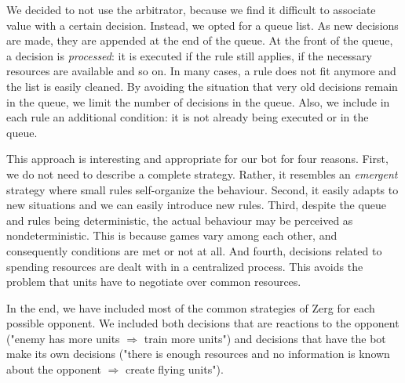We decided to not use the arbitrator, because we find it difficult to associate value with a certain decision. Instead, we opted for a queue list. As new decisions are made, they are appended at the end of the queue. At the front of the queue, a decision is \emph{processed}: it is executed if the rule still applies, if the necessary resources are available and so on. In many cases, a rule does not fit anymore and the list is easily cleaned. By avoiding the situation that very old decisions remain in the queue, we limit the number of decisions in the queue. Also, we include in each rule an additional condition: it is not already being executed or in the queue.

This approach is interesting and appropriate for our bot for four reasons. First, we do not need to describe a complete strategy. Rather, it resembles an \emph{emergent} strategy where small rules self-organize the behaviour. Second, it easily adapts to new situations and we can easily introduce new rules. Third, despite the queue and rules being deterministic, the actual behaviour may be perceived as nondeterministic. This is because games vary among each other, and consequently conditions are met or not at all. And fourth, decisions related to spending resources are dealt with in a centralized process. This avoids the problem that units have to negotiate over common resources.

In the end, we have included most of the common strategies of Zerg for each possible opponent. We included both decisions that are reactions to the opponent ("enemy has more units $\Rightarrow$ train more units") and decisions that have the bot make its own decisions ("there is enough resources and no information is known about the opponent $\Rightarrow$ create flying units"). 





%
%
%


